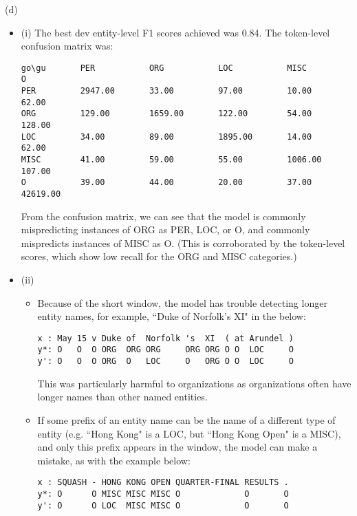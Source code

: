 \documentclass{article}
\begin{document}
(d)
\begin{itemize}
\item (i) The best dev entity-level F1 scores achieved was 0.84. The token-level confusion matrix was:
\begin{verbatim}
go\gu       PER           ORG           LOC           MISC          O
PER         2947.00       33.00         97.00         10.00         62.00
ORG         129.00        1659.00       122.00        54.00         128.00
LOC         34.00         89.00         1895.00       14.00         62.00
MISC        41.00         59.00         55.00         1006.00       107.00
O           39.00         44.00         20.00         37.00         42619.00
\end{verbatim}
From the confusion matrix, we can see that the model is commonly mispredicting instances of ORG as PER, LOC, or O,  and commonly mispredicts instances of MISC as O. (This is corroborated by the token-level scores, which show low recall for the ORG and MISC categories.)
\item (ii)
\begin{itemize}
\item Because of the short window, the model has trouble detecting longer entity names, for example, ``Duke of Norfolk's XI" in the below:
\begin{verbatim}
x : May 15 v Duke of  Norfolk 's  XI  ( at Arundel )
y*: O   O  O ORG  ORG ORG     ORG ORG O O  LOC     O
y': O   O  O ORG  O   LOC     O   ORG O O  LOC     O
\end{verbatim}
This was particularly harmful to organizations as organizations often have longer names than other named entities.
\item If some prefix of an entity name can be the name of a different type of entity (e.g. ``Hong Kong" is a LOC, but ``Hong Kong Open" is a MISC), and only this prefix appears in the window, the model can make a mistake, as with the example below:
\begin{verbatim}
x : SQUASH - HONG KONG OPEN QUARTER-FINAL RESULTS .
y*: O      O MISC MISC MISC O             O       O
y': O      O LOC  MISC MISC O             O       O
\end{verbatim}
\end{itemize}
\end{itemize}
\end{document}
